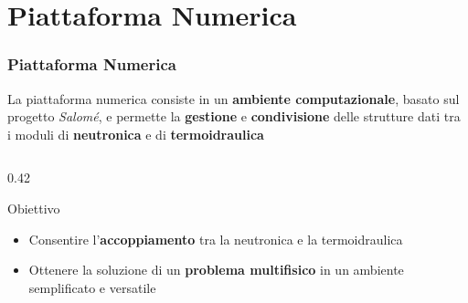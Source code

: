 \section{Piattaforma Numerica}

% 
\begin{frame}
\frametitle{Piattaforma Numerica}

\begin{center}
 \vspace{0.3cm}
%      
%    
 La piattaforma numerica consiste in un \textbf{ambiente computazionale}, basato sul progetto \textit{Salom\'e}, e permette la  
 \textbf{gestione} e \textbf{condivisione} delle strutture dati 
 tra i moduli di \textbf{\textcolor{bleudefrance}{neutronica}} e di \textbf{\textcolor{mygreen}{termoidraulica}} \\
 \end{center}
  \begin{columns}\hspace{0.5cm}
 \begin{column}{0.42\textwidth}
 \begin{block}{Obiettivo}
   \begin{itemize}
    \item Consentire l'\textbf{accoppiamento} tra la 
     neutronica
     e la termoidraulica
    \item Ottenere la soluzione di un \textbf{problema multifisico} in un ambiente semplificato e versatile
   \end{itemize}
  \end{block}

\end{column}
\end{columns}
\end{frame}
